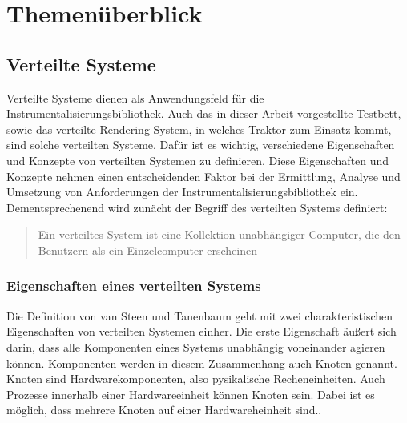 %

\chapter{Themenüberblick}
\label{chapter:Themenüberblick}

\section{Verteilte Systeme}
\label{section:Verteilte Systeme}

Verteilte Systeme dienen als Anwendungsfeld für die Instrumentalisierungsbibliothek. Auch das in dieser Arbeit vorgestellte Testbett, sowie das verteilte Rendering-System, in welches Traktor zum Einsatz kommt, sind solche verteilten Systeme. Dafür ist es wichtig, verschiedene Eigenschaften und Konzepte von verteilten Systemen zu definieren. Diese Eigenschaften und Konzepte nehmen einen entscheidenden Faktor bei der Ermittlung, Analyse und Umsetzung von Anforderungen der Instrumentalisierungsbibliothek ein. Dementsprechenend wird zunächt der Begriff des verteilten Systems definiert:

\begin{quote}
	\cbstart
	Ein verteiltes System ist eine Kollektion unabhängiger Computer, die den Benutzern als ein Einzelcomputer erscheinen 
	\cbend
\end{quote}

\subsection{Eigenschaften eines verteilten Systems}
\label{subsection:Eigenschaften eines verteilten Systems}
	Die Definition von van Steen und Tanenbaum geht mit zwei charakteristischen Eigenschaften von verteilten Systemen einher. Die erste Eigenschaft äußert sich darin, dass alle Komponenten eines Systems unabhängig voneinander agieren können. Komponenten werden in diesem Zusammenhang auch Knoten genannt. Knoten sind Hardwarekomponenten, also pysikalische Recheneinheiten. Auch Prozesse innerhalb einer Hardwareeinheit können Knoten sein. Dabei ist es möglich, dass mehrere Knoten auf einer Hardwareheinheit sind..


